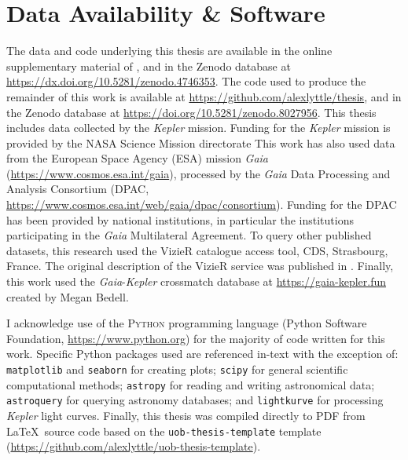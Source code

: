 \chapter*{Data Availability \& Software}

The data and code underlying this thesis are available in the online supplementary material of \citet{Lyttle.Davies.ea2021}, and in the Zenodo database at \url{https://dx.doi.org/10.5281/zenodo.4746353}. The code used to produce the remainder of this work is available at \url{https://github.com/alexlyttle/thesis}, and in the Zenodo database at \url{https://doi.org/10.5281/zenodo.8027956}. This thesis includes data collected by the \emph{Kepler} mission. Funding for the \emph{Kepler} mission is provided by the NASA Science Mission directorate This work has also used data from the European Space Agency (ESA) mission
\emph{Gaia} (\url{https://www.cosmos.esa.int/gaia}), processed by the {\it Gaia}
Data Processing and Analysis Consortium (DPAC,
\url{https://www.cosmos.esa.int/web/gaia/dpac/consortium}). Funding for the DPAC
has been provided by national institutions, in particular the institutions
participating in the \emph{Gaia} Multilateral Agreement. To query other published datasets, this research used the VizieR catalogue access tool, CDS, Strasbourg, France. The original description of the VizieR service was published in \citet{Ochsenbein.Bauer.ea2000}. Finally, this work used the \emph{Gaia}-\emph{Kepler} crossmatch database at \url{https://gaia-kepler.fun} created by Megan Bedell.

I acknowledge use of the \textsc{Python} programming language (Python Software Foundation, \url{https://www.python.org}) for the majority of code written for this work. Specific Python packages used are referenced in-text with the exception of: \texttt{matplotlib} \citep[v3.6.2;][]{Caswell.Lee.ea2022,Hunter2007} and \texttt{seaborn} \citep{Waskom2021} for creating plots; \texttt{scipy} \citep{Virtanen.Gommers.ea2020} for general scientific computational methods; \texttt{astropy} \citep{AstropyCollaboration.Price-Whelan.ea2022} for reading and writing astronomical data; \texttt{astroquery} \citep{Ginsburg.Sipocz.ea2019} for querying astronomy databases; and \texttt{lightkurve} \citep{LightkurveCollaboration.Cardoso.ea2018} for processing \emph{Kepler} light curves. Finally, this thesis was compiled directly to PDF from \LaTeX~source code based on the \texttt{uob-thesis-template} template (\url{https://github.com/alexlyttle/uob-thesis-template}).
